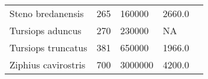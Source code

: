 \begin{longtable}{|p{2.1in}p{0.5in}p{1.0in}p{1.0in}p{1.5in}|}
           Steno bredanensis  &          265 &      160000  &       2660.0   &                                 \citet{miyazaki1994} \\
            Tursiops aduncus  &          270 &      230000  &           NA   &                                    \citet{wells1999} \\
          Tursiops truncatus  &          381 &      650000  &       1966.0   &                                   \citet{perrin1984} \\
         Ziphius cavirostris  &          700 &     3000000  &       4200.0   &                                    \citet{omura1955} \\
  \hline
\end{longtable}

\normalfont

